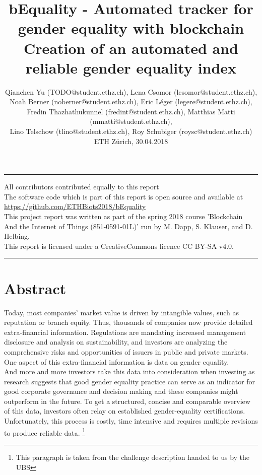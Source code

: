 \documentclass[portrait,a4paper]{article}
\title{bEquality - Automated tracker for gender equality with blockchain \\[-10pt] Creation of an automated and reliable gender equality index}
\author{Qianchen Yu (TODO@student.ethz.ch), Lena Csomor (lcsomor@student.ethz.ch), \\[-4pt] 
Noah Berner (noberner@student.ethz.ch), Eric Léger (legere@student.ethz.ch),\\[-4pt] 
Fredin Thazhathukunnel (fredint@student.ethz.ch), Matthias Matti (mmatti@student.ethz.ch), \\[-4pt] 
Lino Telschow (tlino@student.ethz.ch), Roy Schubiger (roysc@student.ethz.ch) \\[10pt] 
ETH Z\"urich, 30.04.2018 \\[-16pt]}
\date{}
\begin{document}
\maketitle

\vspace{1pt}
\hrule
\vspace{1pt}

\begin{center}
	All contributors contributed equally to this report\\[8pt]
	The software code which is part of this report is open source and available at \url{https://github.com/ETHBiots2018/bEquality}\\[8pt]
	This project report was written as part of the spring 2018 course 'Blockchain And the Internet of Things (851-0591-01L)' run by M. Dapp, S. Klauser, and D. Helbing.\\[8pt]
	This report is licensed under a CreativeCommons licence CC BY-SA v4.0.
\end{center}

\vspace{1pt}
\hrule
\vspace{1pt}

\section*{Abstract}
	Today, most companies' market value is driven by intangible values, such as reputation or branch equity. 
	Thus, thousands of companies now provide detailed extra-financial information. 
	Regulations are mandating increased management disclosure and analysis on sustainability, and investors 
	are analyzing the comprehensive risks and opportunities of issuers in public and private markets. 
	One aspect of this extra-financial information is data on gender equality.\\
	And more and more investors take this data into consideration when investing as research suggests 
	that good gender equality practice can serve as an indicator for good corporate governance and decision 
	making and these companies might outperform in the future.
	To get a structured, concise and comparable overview of this data, investors often relay on established 
	gender-equality certifications. Unfortunately, this process is costly, time intensive and requires 
	multiple revisions to produce reliable data. 
	\footnote{This paragraph is taken from the challenge description handed to us by the UBS}\\
\end{document}
